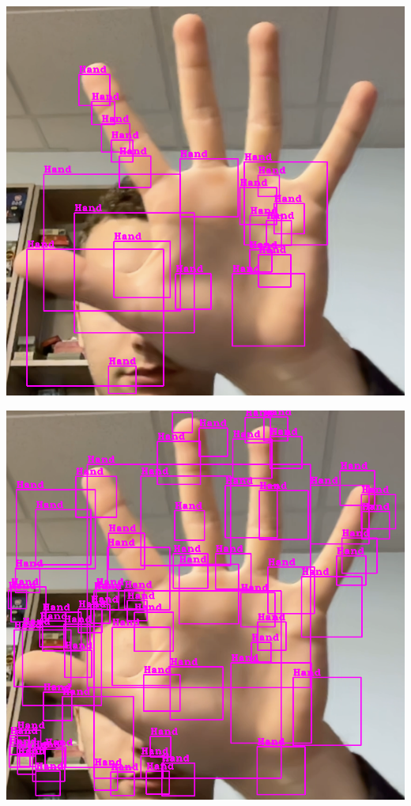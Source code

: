 \documentclass[11pt]{article}
\begin{document}
\begin{minipage}{0.45\textwidth}
    \centering
    \includegraphics[width=\textwidth]{images/cascade8.png}
    \label{fig:res_cascade8}
\end{minipage}
\begin{minipage}{0.45\textwidth}
    \centering
    \includegraphics[width=\textwidth]{images/cascade9.png}
    \label{fig:res_cascade9}
\end{minipage}
\bigbreak
\end{document}
